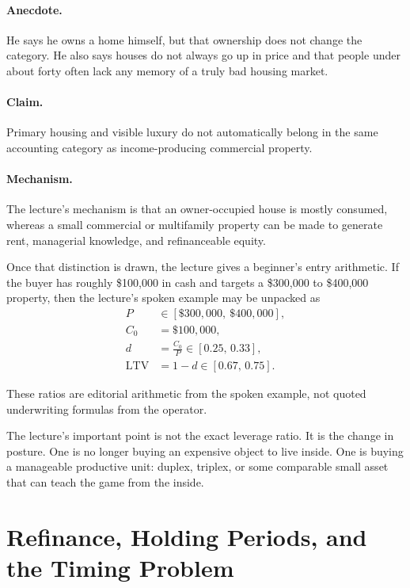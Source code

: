 \paragraph{Anecdote.}
He says he owns a home himself, but that ownership does not change the category. He also says houses do not always go up in price and that people under about forty often lack any memory of a truly bad housing market.

\paragraph{Claim.}
Primary housing and visible luxury do not automatically belong in the same accounting category as income-producing commercial property.

\paragraph{Mechanism.}
The lecture's mechanism is that an owner-occupied house is mostly consumed, whereas a small commercial or multifamily property can be made to generate rent, managerial knowledge, and refinanceable equity.

Once that distinction is drawn, the lecture gives a beginner's entry arithmetic. If the buyer has roughly \$100{,}000 in cash and targets a \$300{,}000 to \$400{,}000 property, then the lecture's spoken example may be unpacked as
\begin{align}
P &\in [\$300{,}000,\ \$400{,}000],\\
C_0 &= \$100{,}000,\\
d &= \frac{C_0}{P}\in [0.25,\,0.33],\\
\mathrm{LTV} &= 1-d \in [0.67,\,0.75].
\end{align}

\begin{remark}
These ratios are editorial arithmetic from the spoken example, not quoted underwriting formulas from the operator.
\end{remark}

The lecture's important point is not the exact leverage ratio. It is the change in posture. One is no longer buying an expensive object to live inside. One is buying a manageable productive unit: duplex, triplex, or some comparable small asset that can teach the game from the inside.

\section{Refinance, Holding Periods, and the Timing Problem}

